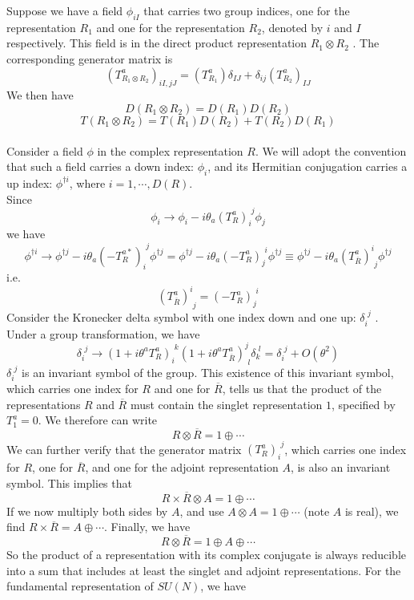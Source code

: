 \noindent
Suppose we have a field $\phi_{iI}$ that carries two group indices, one for the representation $R_1$ and one for the representation $R_2$, denoted by $i$ and $I$ respectively.
This field is in the direct product representation $R_1 \otimes R_2$ . The corresponding generator matrix is
\[(T^a_{R_1 \otimes R_2})_{iI,jJ} = (T^a_{R_1})\delta_{IJ} + \delta_{ij}(T^a_{R_2})_{IJ}\]
We then have
\[D(R_1\otimes R_2) = D(R_1)D(R_2)\]
\[T(R_1\otimes R_2) = T(R_1)D(R_2) + T(R_2)D(R_1)\]
\\
Consider a field $\phi$ in the complex representation $R$. We will adopt the convention that such a field carries a
down index: $\phi_i$, and its Hermitian conjugation carries a up index: $\phi^{\dagger i}$, where $i = 1,\cdots,D(R)$.
\\ 
Since
\[\phi_i \to \phi_i - i\theta_a (T^a_R)_{i}^{\phantom{i}j}\phi_j \]
we have
\[\phi^{\dagger i} \to \phi^{\dagger j} - i\theta_a (-T^{a*}_R)_{i}^{\phantom{i}j}\phi^{\dagger j} = \phi^{\dagger j} - i\theta_a (-T^{a}_R)_{j}^{\phantom{i}i}\phi^{\dagger j} \equiv \phi^{\dagger j} - i\theta_a (T^{a}_{\overline{R}})^{i}_{\phantom{i}j}\phi^{\dagger j}\]
i.e.
\[(T^{a}_{\overline{R}})^{i}_{\phantom{i}j} = (-T^{a}_R)_{j}^{\phantom{i}i}\]
Consider the Kronecker delta symbol with one index down and one up: $\delta_i^{\phantom{i}j}$ . Under a group transformation, we have
\[\delta_i^{\phantom{i}j} \to (1+i\theta^a T^a_R)_{i}^{\phantom{i}k} (1+i\theta^a T^a_{\overline{R}})^{j}_{\phantom{i}l}\delta_k^{\phantom{i}l} = \delta_i^{\phantom{i}j} + O(\theta^2)\]
$\delta_i^{\phantom{i}j}$ is an invariant symbol of the group. This existence of this invariant symbol, which carries one index for $R$ and one for $\overline{R}$, tells us that the product of the representations $R$ and $\overline{R}$ must contain the singlet representation $1$, specified by $T_1^a = 0$. We therefore can write
\[R \otimes \overline{R} = 1 \oplus \cdots\]
We can further verify that the generator matrix $(T_R^a)_i^{\phantom{i}j}$, which carries one index for $R$, one for $\overline{R}$, and one for the adjoint representation $A$, is also an invariant symbol.
This implies that
\[R \times \overline{R} \otimes A = 1 \oplus \cdots\]
If we now multiply both sides by $A$, and use $A \otimes A = 1 \oplus \cdots$ (note $A$ is real), we find $R \times \overline{R} = A \oplus \cdots$. Finally, we have
\[R \otimes \overline{R} = 1 \oplus A \oplus \cdots \]
So the product of a representation with its complex conjugate is always reducible into a sum that includes at least the singlet and adjoint representations. For the fundamental representation of $SU(N)$, we have
